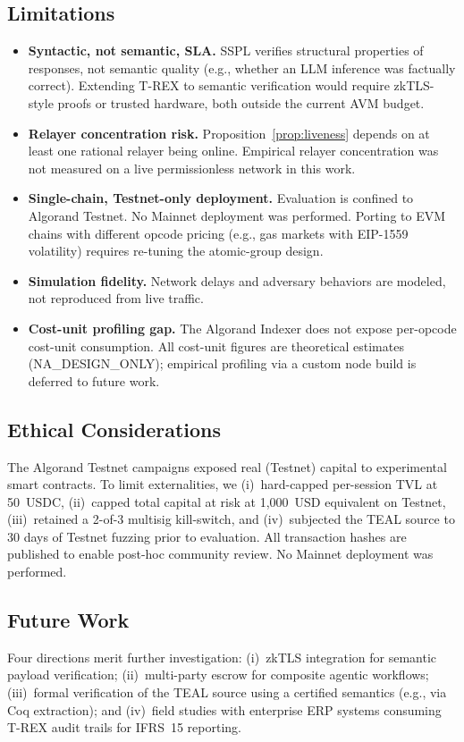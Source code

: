 \documentclass[journal]{IEEEtran}
\begin{document}
\subsection{Limitations}
\begin{itemize}[leftmargin=*]
\item \textbf{Syntactic, not semantic, SLA.}
SSPL verifies structural properties of responses, not semantic
quality (e.g., whether an LLM inference was factually correct).
Extending T-REX to semantic verification would require zkTLS-style
proofs or trusted hardware, both outside the current AVM budget.
\item \textbf{Relayer concentration risk.}
Proposition~\ref{prop:liveness} depends on at least one rational
relayer being online.
Empirical relayer concentration was not measured on a live
permissionless network in this work.
\item \textbf{Single-chain, Testnet-only deployment.}
Evaluation is confined to Algorand Testnet.
No Mainnet deployment was performed.
Porting to EVM chains with different opcode pricing (e.g., gas
markets with EIP-1559 volatility) requires re-tuning the
atomic-group design.
\item \textbf{Simulation fidelity.}
Network delays and adversary behaviors are modeled, not reproduced
from live traffic.
\item \textbf{Cost-unit profiling gap.}
The Algorand Indexer does not expose per-opcode cost-unit
consumption.
All cost-unit figures are theoretical estimates (NA\_DESIGN\_ONLY);
empirical profiling via a custom node build is deferred to future
work.
\end{itemize}

\subsection{Ethical Considerations}
The Algorand Testnet campaigns exposed real (Testnet) capital to
experimental smart contracts.
To limit externalities, we (i)~hard-capped per-session TVL at
50~USDC, (ii)~capped total capital at risk at 1{,}000~USD
equivalent on Testnet, (iii)~retained a 2-of-3 multisig
kill-switch, and (iv)~subjected the TEAL source to 30 days of
Testnet fuzzing prior to evaluation.
All transaction hashes are published to enable post-hoc community
review.
No Mainnet deployment was performed.

\subsection{Future Work}
Four directions merit further investigation:
(i)~zkTLS integration for semantic payload verification;
(ii)~multi-party escrow for composite agentic workflows;
(iii)~formal verification of the TEAL source using a certified
semantics (e.g., via Coq extraction); and
(iv)~field studies with enterprise ERP systems consuming T-REX
audit trails for IFRS~15 reporting.
\end{document}
